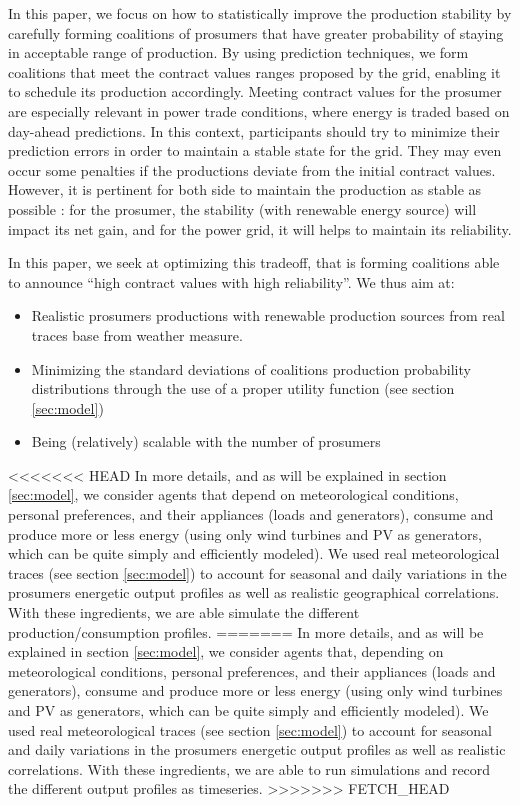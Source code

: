 \documentclass[conference]{IEEEtran}
\begin{document}
In this paper, we focus on how to statistically improve the production stability by carefully forming coalitions of prosumers that have greater probability of staying in acceptable range of production. By using prediction techniques, we form coalitions that meet the contract values ranges proposed by the grid, enabling it to schedule its production accordingly. Meeting contract values for the prosumer are especially relevant in power trade conditions, where energy is traded based on day-ahead predictions. In this context, participants should try to minimize their prediction errors in order to maintain a stable state for the grid. They may even occur some penalties if the productions deviate from the initial contract values. However, it is pertinent for both side to maintain the production as stable as possible : for the prosumer, the stability (with renewable energy source) will impact its net gain, and for the power grid, it will helps to maintain its reliability.

In this paper, we seek at optimizing this tradeoff, that is forming coalitions able to announce “high contract values with high reliability”. We thus aim at:
\begin{itemize}
\item Realistic prosumers productions with renewable production sources  from real traces base from weather measure.
\item Minimizing the standard deviations of coalitions production probability distributions through the use of a proper utility function (see section \ref{sec:model})
\item Being (relatively) scalable with the number of prosumers
\end{itemize}

<<<<<<< HEAD
In more details, and as will be explained in section \ref{sec:model}, we consider agents that depend on meteorological conditions, personal preferences, and their appliances (loads and generators), consume and produce more or less energy (using only wind turbines and PV as generators, which can be quite simply and efficiently modeled).  We used real meteorological traces (see section \ref{sec:model}) to account for seasonal and daily variations in the prosumers energetic output profiles as well as realistic geographical correlations. With these ingredients, we are able simulate the different production/consumption profiles.
=======
In more details, and as will be explained in section \ref{sec:model}, we consider agents that, depending on meteorological conditions, personal preferences, and their appliances (loads and generators), consume and produce more or less energy (using only wind turbines and PV as generators, which can be quite simply and efficiently modeled).  We used real meteorological traces (see section \ref{sec:model}) to account for seasonal and daily variations in the prosumers energetic output profiles as well as realistic correlations. With these ingredients, we are able to run simulations and record the different output profiles as timeseries.
>>>>>>> FETCH_HEAD
\end{document}
